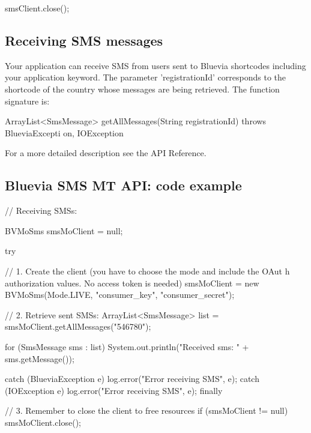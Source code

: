 \begin{DoxyCode}
smsClient.close();
\end{DoxyCode}
\hypertarget{blv_sms_mo_guide_receiving_smsmessages}{}\subsection{Receiving SMS messages}\label{blv_sms_mo_guide_receiving_smsmessages}
Your application can receive SMS from users sent to Bluevia shortcodes including your application keyword. The parameter 'registrationId' corresponds to the shortcode of the country whose messages are being retrieved. The function signature is:


\begin{DoxyCode}
ArrayList<SmsMessage> getAllMessages(String registrationId) throws BlueviaExcepti
      on, IOException
\end{DoxyCode}


For a more detailed description see the API Reference.\hypertarget{blv_sms_mo_guide_blv_sms_api_code_example}{}\subsection{Bluevia SMS MT API: code example}\label{blv_sms_mo_guide_blv_sms_api_code_example}

\begin{DoxyCode}
// Receiving SMSs:

BVMoSms smsMoClient = null;

try {

        // 1. Create the client (you have to choose the mode and include the OAut
      h authorization values. No access token is needed)
        smsMoClient = new BVMoSms(Mode.LIVE, "consumer_key", "consumer_secret");

        // 2. Retrieve sent SMSs:
        ArrayList<SmsMessage> list = smsMoClient.getAllMessages("546780"); 

        for (SmsMessage sms : list){
                System.out.println("Received sms: " + sms.getMessage()); 
        }

} catch (BlueviaException e) {
        log.error("Error receiving SMS", e);
} catch (IOException e) {
        log.error("Error receiving SMS", e);
} finally {

        // 3. Remember to close the client to free resources
        if (smsMoClient != null)
                smsMoClient.close();
} 
\end{DoxyCode}
 
